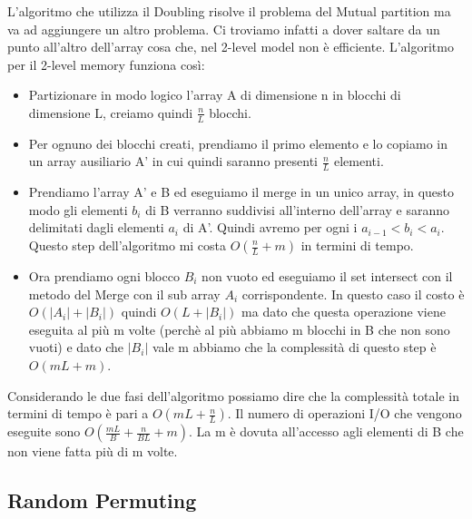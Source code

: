 \documentclass[14pt]{extreport}
\begin{document}
L'algoritmo che utilizza il Doubling risolve il problema del Mutual partition ma va ad aggiungere un altro problema. Ci troviamo infatti a dover saltare da un punto all'altro dell'array cosa che, nel 2-level model non è efficiente.
L'algoritmo per il 2-level memory funziona così:
\begin{itemize}
\item Partizionare in modo logico l'array A di dimensione n in blocchi di dimensione L, creiamo quindi $\frac{n}{L}$ blocchi.
\item Per ognuno dei blocchi creati, prendiamo il primo elemento e lo copiamo in un array ausiliario A' in cui quindi saranno presenti $\frac{n}{L}$ elementi.
\item Prendiamo l'array A' e B ed eseguiamo il merge in un unico array, in questo modo gli elementi $b_i$ di B verranno suddivisi all'interno dell'array e saranno delimitati dagli elementi $a_i$ di A'. Quindi avremo per ogni i $a_{i-1}<b_{i}<a_{i}$. Questo step dell'algoritmo mi costa $O(\frac{n}{L} + m)$ in termini di tempo.
\item Ora prendiamo ogni blocco $B_i$ non vuoto ed eseguiamo il set intersect con il metodo del Merge con il sub array $A_i$ corrispondente. In questo caso il costo è $O(|A_i| + |B_i|)$ quindi $O(L + |B_i|)$ ma dato che questa operazione viene eseguita al più m volte (perchè al più abbiamo m blocchi in B che non sono vuoti) e dato che $|B_i|$ vale m abbiamo che la complessità di questo step è $O(mL + m)$.
\end{itemize} 
Considerando le due fasi dell'algoritmo possiamo dire che la complessità totale in termini di tempo è pari a $O(mL + \frac{n}{L})$.
Il numero di operazioni I/O che vengono eseguite sono $O(\frac{mL}{B} + \frac{n}{BL} + m)$. La m è dovuta all'accesso agli elementi di B che non viene fatta più di m volte.

\subsection{Random Permuting}
\end{document}
